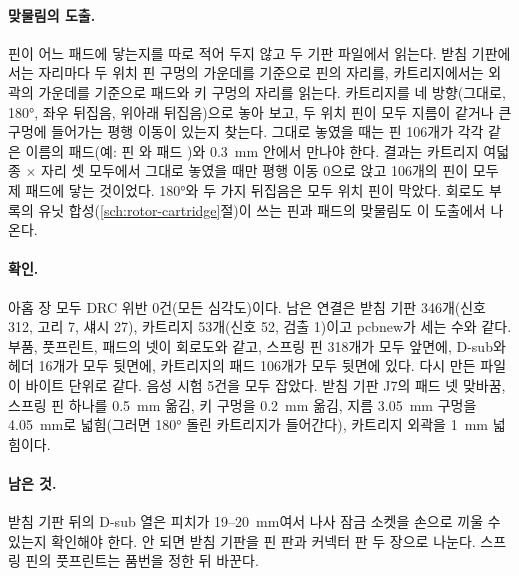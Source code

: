 \paragraph{맞물림의 도출.} 핀이 어느 패드에 닿는지를 따로 적어 두지 않고 두 기판 파일에서 읽는다. 받침 기판에서는 자리마다
두 위치 핀 구멍의 가운데를 기준으로 핀의 자리를, 카트리지에서는 외곽의 가운데를 기준으로 패드와 키 구멍의 자리를 읽는다.
카트리지를 네 방향(그대로, 180°, 좌우 뒤집음, 위아래 뒤집음)으로 놓아 보고, 두 위치 핀이 모두 지름이 같거나 큰 구멍에
들어가는 평행 이동이 있는지 찾는다. 그대로 놓였을 때는 핀 106개가 각각 같은 이름의 패드(예: 핀 와 패드
)와 0.3~mm 안에서 만나야 한다. 결과는 카트리지 여덟 종 $\times$ 자리 셋 모두에서 그대로 놓였을 때만 평행 이동
0으로 앉고 106개의 핀이 모두 제 패드에 닿는 것이었다. 180°와 두 가지 뒤집음은 모두 위치 핀이 막았다. 회로도 부록의 유닛
합성(\ref{sch:rotor-cartridge}절)이 쓰는 핀과 패드의 맞물림도 이 도출에서 나온다.

\paragraph{확인.} 아홉 장 모두 DRC 위반 0건(모든 심각도)이다. 남은 연결은 받침 기판 346개(신호 312, 고리 7, 섀시 27),
카트리지 53개(신호 52, 검출 1)이고 pcbnew가 세는 수와 같다. 부품, 풋프린트, 패드의 넷이 회로도와 같고, 스프링 핀 318개가
모두 앞면에, D-sub와 헤더 16개가 모두 뒷면에, 카트리지의 패드 106개가 모두 뒷면에 있다. 다시 만든 파일이 바이트 단위로
같다. 음성 시험 5건을 모두 잡았다. 받침 기판 J7의 패드 넷 맞바꿈, 스프링 핀 하나를 0.5~mm 옮김, 키 구멍을 0.2~mm 옮김,
지름 3.05~mm 구멍을 4.05~mm로 넓힘(그러면 180° 돌린 카트리지가 들어간다), 카트리지 외곽을 1~mm 넓힘이다.

\paragraph{남은 것.} 받침 기판 뒤의 D-sub 열은 피치가 19--20~mm여서 나사 잠금 소켓을 손으로 끼울 수 있는지 확인해야
한다. 안 되면 받침 기판을 핀 판과 커넥터 판 두 장으로 나눈다. 스프링 핀의 풋프린트는 품번을 정한 뒤 바꾼다.


